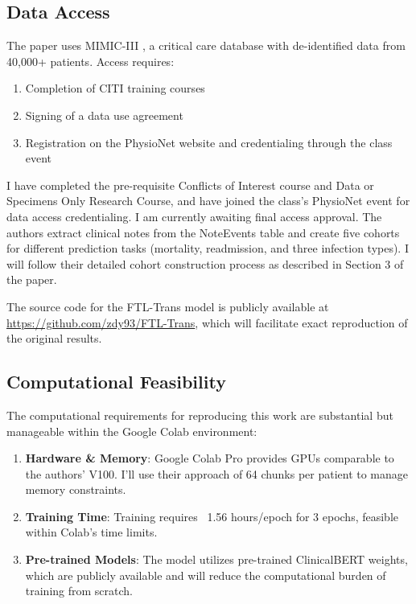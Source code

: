 \documentclass[10pt,letterpaper,twocolumn]{article}
\begin{document}
\subsection{Data Access}

The paper uses MIMIC-III \cite{johnson2016mimic}, a critical care database with de-identified data from 40,000+ patients. Access requires:

\begin{enumerate}[leftmargin=*]
    \item Completion of CITI training courses
    \item Signing of a data use agreement
    \item Registration on the PhysioNet website and credentialing through the class event
\end{enumerate}

I have completed the pre-requisite Conflicts of Interest course and Data or Specimens Only Research Course, and have joined the class's PhysioNet event for data access credentialing. I am currently awaiting final access approval. The authors extract clinical notes from the NoteEvents table and create five cohorts for different prediction tasks (mortality, readmission, and three infection types). I will follow their detailed cohort construction process as described in Section 3 of the paper.

The source code for the FTL-Trans model is publicly available at \url{https://github.com/zdy93/FTL-Trans}, which will facilitate exact reproduction of the original results.

\subsection{Computational Feasibility}

The computational requirements for reproducing this work are substantial but manageable within the Google Colab environment:

\begin{enumerate}[leftmargin=*]
	\item \textbf{Hardware \& Memory}: Google Colab Pro provides GPUs comparable to the authors' V100. I'll use their approach of 64 chunks per patient to manage memory constraints.
    
    \item \textbf{Training Time}: Training requires ~1.56 hours/epoch for 3 epochs, feasible within Colab's time limits.
    
    \item \textbf{Pre-trained Models}: The model utilizes pre-trained ClinicalBERT \cite{huang2019clinicalbert} weights, which are publicly available and will reduce the computational burden of training from scratch.
\end{enumerate}
\end{document}
